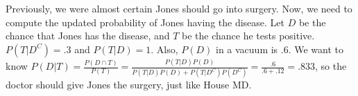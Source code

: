 \documentclass{article}
\begin{document}
\begin{solution}
Previously, we were almost certain Jones should go into surgery. Now, we need to compute the updated probability of Jones having the disease. Let $D$ be the chance that Jones has the disease, and $T$ be the chance he tests positive. $P(T \vert D^C) = .3$ and $P(T \vert D) = 1$. Also, $P(D)$ in a vacuum is $.6$. We want to know $P(D \vert T) = \frac{P(D \cap T)}{P(T)} = \frac{P(T \vert D)P(D)}{P(T \vert D)P(D) + P(T \vert D^C)P(D^C)} = \frac{.6}{.6 + .12} = .833$, so the doctor should give Jones the surgery, just like House MD. 
\end{solution}
\end{document}
